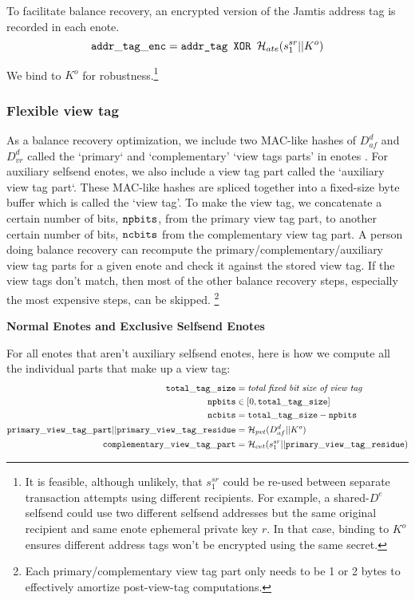 To facilitate balance recovery, an encrypted version of the Jamtis address tag is recorded in each enote.
\[ {\tt addr\_tag\_enc} = \textrm{\tt addr\_tag XOR } \mathcal{H}_{ate}(s^{sr}_1 || K^o) \]

We bind to $K^o$ for robustness.\footnote{It is feasible, although unlikely, that $s^{sr}_1$ could be re-used between separate transaction attempts using different recipients. For example, a shared-$D^e$ selfsend could use two different selfsend addresses but the same original recipient and same enote ephemeral private key $r$. In that case, binding to $K^o$ ensures different address tags won't be encrypted using the same secret.}

\subsubsection{Flexible view tag}
\label{subsubsec:jamtis-enote-construction-view-tag}

As a balance recovery optimization, we include two MAC-like hashes of $D^d_{af}$ and $D^d_{vr}$ called the `primary` and `complementary' `view tags parts' in enotes \cite{reduce-scan-times-view-tag-research-issue-73}. For auxiliary selfsend enotes, we also include a view tag part called the `auxiliary view tag part`. These MAC-like hashes are spliced together into a fixed-size byte buffer which is called the `view tag'. To make the view tag, we concatenate a certain number of bits, ${\tt npbits}$, from the primary view tag part, to another certain number of bits, ${\tt ncbits}$ from the complementary view tag part. A person doing balance recovery can recompute the primary/complementary/auxiliary view tag parts for a given enote and check it against the stored view tag. If the view tags don't match, then most of the other balance recovery steps, especially the most expensive steps, can be skipped. \footnote{Each primary/complementary view tag part only needs to be 1 or 2 bytes to effectively amortize post-view-tag computations.}

\textbf{Normal Enotes and Exclusive Selfsend Enotes}

For all enotes that aren't auxiliary selfsend enotes, here is how we compute all the individual parts that make up a view tag:
\begin{align*}
    {\tt total\_tag\_size} &= \textit{total fixed bit size of view tag} \\
    {\tt npbits} &\in [0, {\tt total\_tag\_size}] \\
    {\tt ncbits} &= {\tt total\_tag\_size} - {\tt npbits} \\
    {\tt primary\_view\_tag\_part} || {\tt primary\_view\_tag\_residue} &= \mathcal{H}_{pvt}(D^d_{af} || K^o) \\
    {\tt complementary\_view\_tag\_part} &= \mathcal{H}_{cvt}(s^{sr}_1 || {\tt primary\_view\_tag\_residue}) \\
\end{align*}

